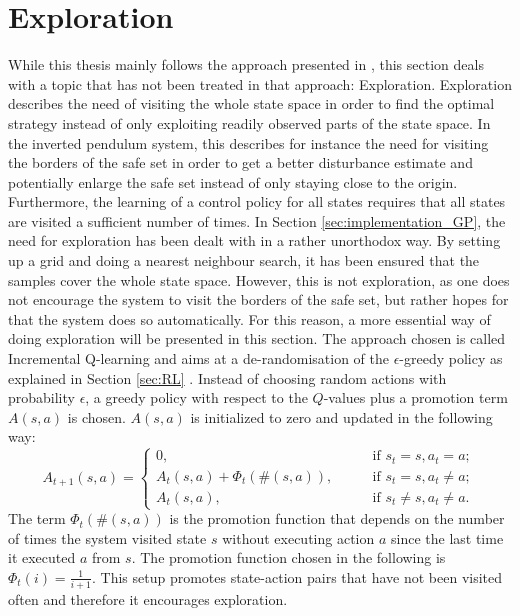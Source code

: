 \documentclass[../main.tex]{subfiles}
\begin{document}
\section{Exploration} \label{sec:Exploration}
While this thesis mainly follows the approach presented in \cite{akametalu2014reachability}, this section deals with a topic that has not been treated in that approach: Exploration. Exploration describes the need of visiting the whole state space in order to find the optimal strategy instead of only exploiting readily observed parts of the state space. In the inverted pendulum system, this describes for instance the need for visiting the borders of the safe set in order to get a better disturbance estimate and potentially enlarge the safe set instead of only staying close to the origin. Furthermore, the learning of a control policy for all states requires that all states are visited a sufficient number of times. In Section \ref{sec:implementation_GP}, the need for exploration has been dealt with in a rather unorthodox way. By setting up a grid and doing a nearest neighbour search, it has been ensured that the samples cover the whole state space. However, this is not exploration, as one does not encourage the system to visit the borders of the safe set, but rather hopes for that the system does so automatically. For this reason, a more essential way of doing exploration will be presented in this section. The approach chosen is called Incremental Q-learning and aims at a de-randomisation of the $\epsilon$-greedy policy as explained in Section \ref{sec:RL} \cite{even2001convergence}. Instead of choosing random actions with probability $\epsilon$, a greedy policy with respect to the $Q$-values plus a promotion term $A(s,a)$ is chosen. $A(s,a)$ is initialized to zero and updated in the following way:
\begin{equation}
    A_{t+1}(s,a) = 
\begin{cases}
    0,\qquad &\text{if } s_t = s, a_t = a;\\    
    A_{t}(s,a) + \Phi_t(\#(s,a)),\qquad &\text{if } s_t = s, a_t \neq a;\\
    A_{t}(s,a),\qquad &\text{if } s_t \neq s, a_t \neq a.
\end{cases}
\end{equation}
The term $\Phi_t(\#(s,a))$ is the promotion function that depends on the number of times the system visited state $s$ without executing action $a$ since the last time it executed $a$ from $s$. The promotion function chosen in the following is $\Phi_t(i) = \frac{1}{i+1}$. This setup promotes state-action pairs that have not been visited often and therefore it encourages exploration.
\end{document}
